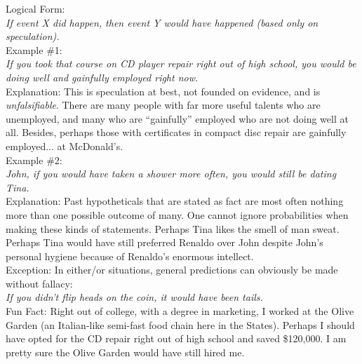 \documentclass[a4paper,12pt,single,pdftex]{scrbook}
\begin{document}
    
      Logical Form:
    \\

    
      {\em If event X did happen, then event Y would have happened (based only on speculation).}
    \\

    
      Example \#1:
    \\

    
      {\em If you took that course on CD player repair right out of high school, you would be doing well and gainfully employed right now.}
    \\

    
      Explanation: This is speculation at best, not founded on evidence, and is {\it unfalsifiable}.  There are many people with far more useful talents who are unemployed, and many who are “gainfully” employed who are not doing well at all. Besides, perhaps those with certificates in compact disc repair are gainfully employed... at McDonald’s.
    \\

    
      Example \#2:
    \\

    
      {\em John, if you would have taken a shower more often, you would still be dating Tina.}
    \\

    
      Explanation: Past hypotheticals that are stated as fact are most often nothing more than one possible outcome of many.  One cannot ignore probabilities when making these kinds of statements.  Perhaps Tina likes the smell of man sweat.  Perhaps Tina would have still preferred Renaldo over John despite John's personal hygiene because of Renaldo's enormous intellect.
    \\

    
      Exception: In either/or situations, general predictions can obviously be made without fallacy:
    \\

    
      {\em If you didn’t flip heads on the coin, it would have been tails.}
    \\

    
      Fun Fact: Right out of college, with a degree in marketing, I worked at the Olive Garden (an Italian-like semi-fast food chain here in the States). Perhaps I should have opted for the CD repair right out of high school and saved \$120,000. I am pretty sure the Olive Garden would have still hired me.
    \\
\end{document}
